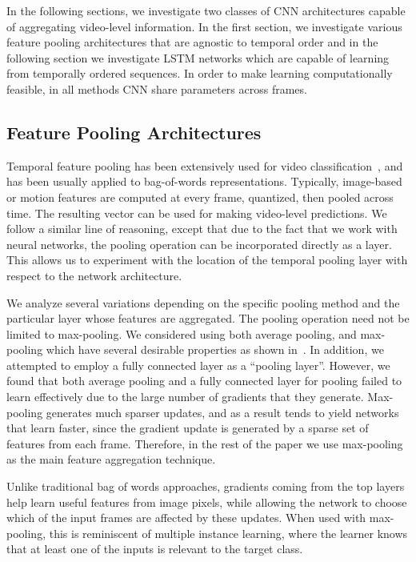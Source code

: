 \documentclass[10pt,twocolumn,letterpaper]{article}
\begin{document}
In the following sections, we investigate two classes of CNN architectures
capable of aggregating video-level information. In the first section, we
investigate various feature pooling architectures that are agnostic to temporal
order and in the following section we investigate LSTM networks which are capable of
learning from temporally ordered sequences. In order to make learning computationally feasible,
in all methods CNN share parameters across frames.

\vspace{-.6em}\subsection{Feature Pooling Architectures}\vspace{-.6em}\label{subsec:maxpoolarch}
Temporal feature pooling has been extensively used for video
classification~\cite{laptev-actions,Wang09evaluationof,jain13}, and has been usually
applied to bag-of-words representations. Typically, image-based or motion
features are computed at every frame, quantized, then pooled across time.  The resulting
vector can be used for making video-level predictions. We follow a
similar line of reasoning, except that due to the fact that we work with neural
networks, the pooling operation can be incorporated directly as a layer. This allows
us to experiment with the location of the temporal pooling layer with respect
to the network architecture.

We analyze several variations depending on the specific pooling method and the
particular layer whose features are aggregated. The pooling operation need not
be limited to max-pooling. We considered using both average pooling, and max-pooling
which have several desirable properties as shown in~\cite{boureau10}. In
addition, we attempted to employ a fully connected layer as a ``pooling
layer''. However, we found that both average pooling and a fully
connected layer for pooling failed to learn effectively due to the large number
of gradients that they generate. Max-pooling generates much sparser updates,
and as a result tends to yield networks that learn faster, since the
gradient update is generated by a sparse set of features from each frame. Therefore, in the rest of the paper we use max-pooling as
the main feature aggregation technique.

Unlike traditional bag of words approaches, gradients coming from the top layers help learn useful features from image pixels, while allowing
the network to choose which of the input frames are affected by these updates. When used with max-pooling, this is reminiscent of multiple instance learning,
where the learner knows that at least one of the inputs is relevant to the target class.
\end{document}

